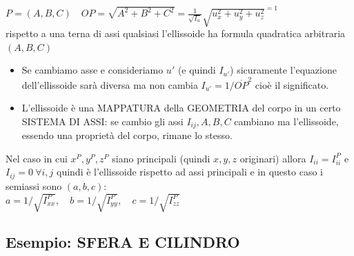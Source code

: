 \documentclass[12pt]{article}
\begin{document}
\vspace{0.3cm}
\begin{minipage}{0.65\textwidth}
$P = (A,B,C) \quad OP = \sqrt{A^2 + B^2 + C^2} = \frac{1}{\sqrt{I_u}} \sqrt{u_x^2 + u_y^2 + u_z^2}^{=1}$ \\[0.2cm]
 \quad rispetto a una terna di assi qualsiasi l'ellissoide ha formula quadratica arbitraria $(A,B,C)$
\end{minipage}
\begin{minipage}{0.3\textwidth}
\end{minipage}

\vspace{0.5cm}
\begin{itemize}
    \item Se cambiamo asse e consideriamo $u'$ (e quindi $I_{u'}$) sicuramente l'equazione dell'ellissoide sarà diversa ma non cambia $I_{u'} = 1 / \overline{OP}^2$ cioè il significato.
    \item[$\Rightarrow$] L'ellissoide è una MAPPATURA della GEOMETRIA del corpo in un certo SISTEMA DI ASSI: se cambio gli assi $I_{ij}, A, B, C$ cambiano ma l'ellissoide, essendo una proprietà del corpo, rimane lo stesso.
\end{itemize}

\vspace{0.3cm}
\noindent Nel caso in cui $x^P, y^P, z^P$ siano principali (quindi $x, y, z$ originari) allora $I_{ii} = I_{ii}^P$ e $I_{ij} = 0 \ \forall i,j$ quindi
 è l'ellissoide rispetto ad assi principali e in questo caso i semiassi sono $(a,b,c)$: \\
$a = 1/\sqrt{I_{xx}^P}, \quad b = 1/\sqrt{I_{yy}^P}, \quad c = 1/\sqrt{I_{zz}^P}$

\subsection*{Esempio: SFERA E CILINDRO}
\end{document}
